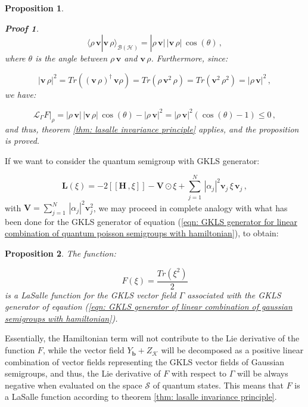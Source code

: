 \documentclass[11pt]{article}
\newcommand{\be}{\begin{equation}}
\newcommand{\ee}{\end{equation}}
\newcommand{\stsp}{\mathcal{S}}
\newtheorem{prop}{Proposition}
\newtheorem*{pf}{Proof}
\begin{document}
\begin{prop}
\begin{pf}
\be
\langle \rho\,\mathbf{v}|\mathbf{v}\,\rho\rangle_{\mathcal{B}(\mathcal{H})}=|\rho\,\mathbf{v}|\,|\mathbf{v}\,\rho|\,\cos(\theta)\,,
\ee
where $\theta$ is the angle between $\rho\,\mathbf{v}$ and $\mathbf{v}\,\rho$.
Furthermore, since:

\be
|\mathbf{v}\,\rho|^{2}=Tr\left((\mathbf{v}\,\rho)^{\dagger}\,\mathbf{v}\rho\right)=Tr\left(\rho\,\mathbf{v}^{2}\,\rho\right)=Tr\left(\mathbf{v}^{2}\,\rho^{2}\right)=|\rho\,\mathbf{v}|^{2}\,,
\ee
we have:

\be
\left.\mathcal{L}_{\Gamma}F\right|_{\rho}=|\rho\,\mathbf{v}|\,|\mathbf{v}\,\rho|\,\cos(\theta) - |\rho\,\mathbf{v}|^{2}=|\rho\,\mathbf{v}|^{2}\left(\cos(\theta)-1\right)\leq 0\,,
\ee
and thus, theorem \ref{thm: lasalle invariance principle} applies, and the proposition is proved.
\end{pf}
\end{prop}

If we want to consider the quantum semigroup with GKLS generator:

\be\label{eqn: GKLS generator of linear combination of gaussian semigroups with hamiltonian}
\mathbf{L}(\xi)=-2\left[\left[\mathbf{H}\,,\xi\right]\right] - \mathbf{V}\odot\xi + \sum_{j=1}^{N}\,|\alpha_{j}|^{2}\mathbf{v}_{j}\,\xi\,\mathbf{v}_{j}\,,
\ee
with $\mathbf{V}=\sum_{j=1}^{N}\,|\alpha_{j}|^{2}\mathbf{v}_{j}^{2}$, we may proceed in complete analogy with what has been done for the GKLS generator of equation (\ref{eqn: GKLS generator for linear combination of quantum poisson semigroups with hamiltonian}), to obtain:

\begin{prop}\label{prop: purity is a lasalle function for linear combinations of quantum gaussian semigroups with hamiltonian}
The function:

\be
F(\xi)=\frac{Tr\left(\xi^{2}\right)}{2}
\ee
is a LaSalle function for the GKLS vector field $\Gamma$ associated with the GKLS generator of eqaution (\ref{eqn: GKLS generator of linear combination of gaussian semigroups with hamiltonian}).
\end{prop}

Essentially, the Hamiltonian term will not contribute to the Lie derivative of the function $F$, while the vector field $Y_{\mathbf{b}} + Z_{\mathcal{K}}$ will be decomposed as a positive linear combination of vector fields representing the GKLS vector fields of Gaussian semigroups, and thus, the Lie derivative of $F$ with respect to $\Gamma$ will be always negative when evaluated on the space $\stsp$ of quantum states.
This means that $F$ is a LaSalle function according to theorem \ref{thm: lasalle invariance principle}.
\end{document}

